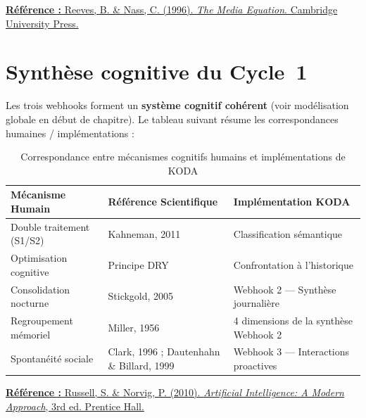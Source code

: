 \documentclass[a4paper,12pt]{report}
\begin{document}
	\noindent\underline{\textbf{Référence :} Reeves, B. \& Nass, C. (1996). \textit{The Media Equation}. Cambridge University Press.}
	
	\section{Synthèse cognitive du Cycle~1}
	
	Les trois webhooks forment un \textbf{système cognitif cohérent} (voir modélisation
	globale en début de chapitre). Le tableau suivant résume les correspondances humaines /
	implémentations :
	
	\begin{table}[ht]
		\centering
		\caption{Correspondance entre mécanismes cognitifs humains et implémentations de KODA}
		\begin{tabularx}{\textwidth}{|X|X|X|}
			\hline
			\textbf{Mécanisme Humain} & \textbf{Référence Scientifique} & \textbf{Implémentation KODA} \\
			\hline
			Double traitement (S1/S2) & Kahneman, 2011 & Classification sémantique \\
			\hline
			Optimisation cognitive & Principe DRY & Confrontation à l'historique \\
			\hline
			Consolidation nocturne & Stickgold, 2005 & Webhook 2 — Synthèse journalière \\
			\hline
			Regroupement mémoriel & Miller, 1956 & 4 dimensions de la synthèse Webhook 2 \\
			\hline
			Spontanéité sociale & Clark, 1996 ; Dautenhahn \& Billard, 1999 & Webhook 3 — Interactions proactives \\
			\hline
		\end{tabularx}
		\label{tab:correspondance_cognitive}
	\end{table}
	
	
	\noindent\underline{\textbf{Référence :} Russell, S. \& Norvig, P. (2010). \textit{Artificial Intelligence: A Modern Approach}, 3rd ed. Prentice Hall.}
	
\end{document}
